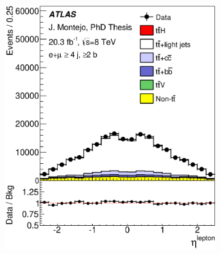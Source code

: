 \begin{figure}[tp!]
\begin{subfigure}{0.32\textwidth}
  \caption{} \end{subfigure}
  \\
  \begin{subfigure}{0.32\textwidth}
  \includegraphics[width=\textwidth]{Modeling/Figures/plots_4j2b/lep_eta_ELEMUON_4jetin2btagin_NOMINAL.eps}
  \caption{} \end{subfigure}
  \begin{subfigure}{0.32\textwidth}

\end{subfigure}
\end{figure}
